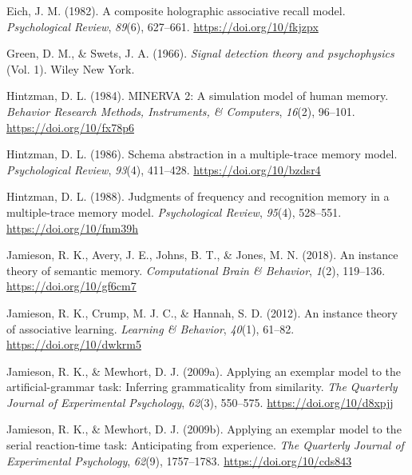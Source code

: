 \documentclass[
  english,
  man,floatsintext]{apa6}
\begin{document}
\leavevmode\hypertarget{ref-eichCompositeHolographicAssociative1982}{}%
Eich, J. M. (1982). A composite holographic associative recall model. \emph{Psychological Review}, \emph{89}(6), 627--661. \url{https://doi.org/10/fkjzpx}

\leavevmode\hypertarget{ref-greenSignalDetectionTheory1966}{}%
Green, D. M., \& Swets, J. A. (1966). \emph{Signal detection theory and psychophysics} (Vol. 1). Wiley New York.

\leavevmode\hypertarget{ref-hintzmanMINERVASimulationModel1984}{}%
Hintzman, D. L. (1984). MINERVA 2: A simulation model of human memory. \emph{Behavior Research Methods, Instruments, \& Computers}, \emph{16}(2), 96--101. \url{https://doi.org/10/fx78p6}

\leavevmode\hypertarget{ref-hintzmanSchemaAbstractionMultipletrace1986}{}%
Hintzman, D. L. (1986). Schema abstraction in a multiple-trace memory model. \emph{Psychological Review}, \emph{93}(4), 411--428. \url{https://doi.org/10/bzdsr4}

\leavevmode\hypertarget{ref-hintzmanJudgmentsFrequencyRecognition1988}{}%
Hintzman, D. L. (1988). Judgments of frequency and recognition memory in a multiple-trace memory model. \emph{Psychological Review}, \emph{95}(4), 528--551. \url{https://doi.org/10/fnm39h}

\leavevmode\hypertarget{ref-jamiesonInstanceTheorySemantic2018}{}%
Jamieson, R. K., Avery, J. E., Johns, B. T., \& Jones, M. N. (2018). An instance theory of semantic memory. \emph{Computational Brain \& Behavior}, \emph{1}(2), 119--136. \url{https://doi.org/10/gf6cm7}

\leavevmode\hypertarget{ref-jamiesonInstanceTheoryAssociative2012}{}%
Jamieson, R. K., Crump, M. J. C., \& Hannah, S. D. (2012). An instance theory of associative learning. \emph{Learning \& Behavior}, \emph{40}(1), 61--82. \url{https://doi.org/10/dwkrm5}

\leavevmode\hypertarget{ref-jamiesonApplyingExemplarModel2009}{}%
Jamieson, R. K., \& Mewhort, D. J. (2009a). Applying an exemplar model to the artificial-grammar task: Inferring grammaticality from similarity. \emph{The Quarterly Journal of Experimental Psychology}, \emph{62}(3), 550--575. \url{https://doi.org/10/d8xpjj}

\leavevmode\hypertarget{ref-jamiesonApplyingExemplarModel2009a}{}%
Jamieson, R. K., \& Mewhort, D. J. (2009b). Applying an exemplar model to the serial reaction-time task: Anticipating from experience. \emph{The Quarterly Journal of Experimental Psychology}, \emph{62}(9), 1757--1783. \url{https://doi.org/10/cds843}
\end{document}
